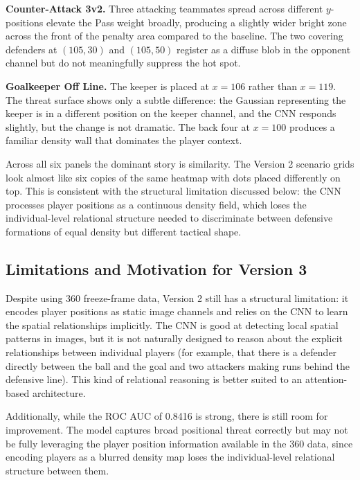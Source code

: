 \documentclass{article}
\begin{document}
\textbf{Counter-Attack 3v2.} Three attacking teammates spread across different $y$-positions elevate the Pass weight broadly, producing a slightly wider bright zone across the front of the penalty area compared to the baseline. The two covering defenders at $(105, 30)$ and $(105, 50)$ register as a diffuse blob in the opponent channel but do not meaningfully suppress the hot spot.

\textbf{Goalkeeper Off Line.} The keeper is placed at $x = 106$ rather than $x = 119$. The threat surface shows only a subtle difference: the Gaussian representing the keeper is in a different position on the keeper channel, and the CNN responds slightly, but the change is not dramatic. The back four at $x = 100$ produces a familiar density wall that dominates the player context.

Across all six panels the dominant story is similarity. The Version 2 scenario grids look almost like six copies of the same heatmap with dots placed differently on top. This is consistent with the structural limitation discussed below: the CNN processes player positions as a continuous density field, which loses the individual-level relational structure needed to discriminate between defensive formations of equal density but different tactical shape.

\subsection{Limitations and Motivation for Version 3}

Despite using 360 freeze-frame data, Version 2 still has a structural limitation: it encodes player positions as static image channels and relies on the CNN to learn the spatial relationships implicitly. The CNN is good at detecting local spatial patterns in images, but it is not naturally designed to reason about the explicit relationships between individual players (for example, that there is a defender directly between the ball and the goal and two attackers making runs behind the defensive line). This kind of relational reasoning is better suited to an attention-based architecture.

Additionally, while the ROC AUC of 0.8416 is strong, there is still room for improvement. The model captures broad positional threat correctly but may not be fully leveraging the player position information available in the 360 data, since encoding players as a blurred density map loses the individual-level relational structure between them.
\end{document}
